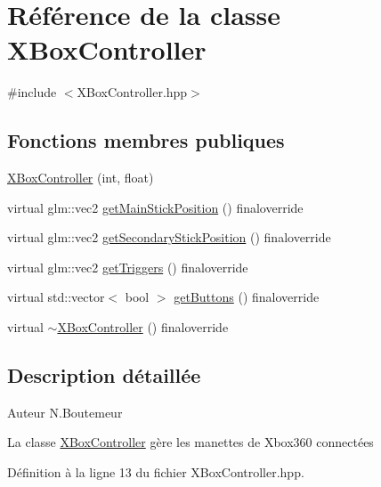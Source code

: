 \hypertarget{classXBoxController}{\section{Référence de la classe X\+Box\+Controller}
\label{classXBoxController}
}


{\ttfamily \#include $<$X\+Box\+Controller.\+hpp$>$}

\subsection*{Fonctions membres publiques}
\begin{DoxyCompactItemize}
\item 
\hyperlink{classXBoxController_aebd5a50eac92047b21ce4f614c5da14d}{X\+Box\+Controller} (int, float)
\item 
virtual glm\+::vec2 \hyperlink{classXBoxController_adec21f77b6380856458c5e991c2d2805}{get\+Main\+Stick\+Position} () finaloverride
\item 
virtual glm\+::vec2 \hyperlink{classXBoxController_a6fe09f7fe9cc8439a909cbf45cdcaafd}{get\+Secondary\+Stick\+Position} () finaloverride
\item 
virtual glm\+::vec2 \hyperlink{classXBoxController_a3b3cf6e2302e80423f5ffe060cf502db}{get\+Triggers} () finaloverride
\item 
virtual std\+::vector$<$ bool $>$ \hyperlink{classXBoxController_a7f2177c57462c0f488986affcd7e8811}{get\+Buttons} () finaloverride
\item 
virtual \hyperlink{classXBoxController_a89464cf2fb5a1e3ffb03c933de70c154}{$\sim$\+X\+Box\+Controller} () finaloverride
\end{DoxyCompactItemize}


\subsection{Description détaillée}
\begin{DoxyAuthor}{Auteur}
N.\+Boutemeur
\end{DoxyAuthor}
La classe \hyperlink{classXBoxController}{X\+Box\+Controller} gère les manettes de Xbox360 connectées 

Définition à la ligne 13 du fichier X\+Box\+Controller.\+hpp.



